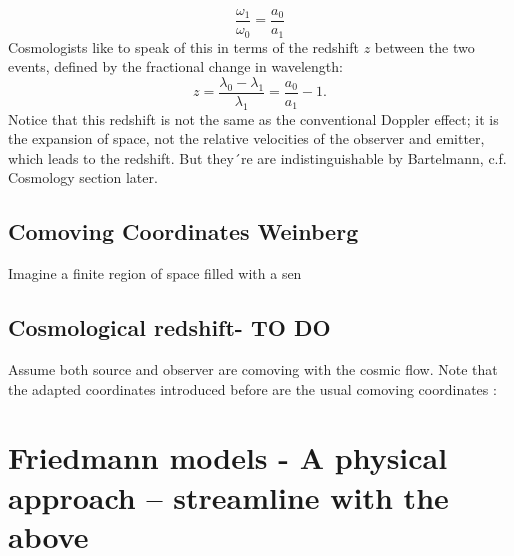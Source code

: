 \begin{equation}
\frac{\omega_1}{\omega_0} = \frac{a_0}{a_1}
\end{equation}
Cosmologists like to speak of this in terms of the redshift $z$ between the two events, defined
by the fractional change in wavelength:
\begin{equation}
z=\frac{\lambda_0-\lambda_1}{\lambda_1} = \frac{a_0}{a_1}-1.
\end{equation}
Notice that this redshift is not the same as the conventional Doppler effect; it is the expansion
of space, not the relative velocities of the observer and emitter, which leads to the redshift. But they´re are indistinguishable by Bartelmann, c.f. Cosmology section later. 







\subsection{Comoving Coordinates Weinberg}
Imagine a finite region of space filled with a sen




\subsection{Cosmological redshift- TO DO}
Assume both source and observer are comoving with the cosmic flow. Note that the adapted coordinates introduced before are the usual comoving coordinates :	



\newpage

\section{Friedmann models - A physical approach -- streamline with the above}
